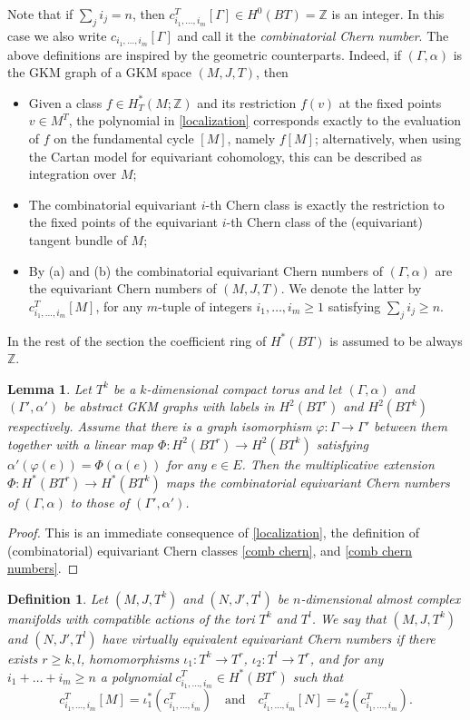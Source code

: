 \documentclass[12pt,a4paper]{amsart}
\newcommand{\ZZ}{\mathbb{Z}}
\newtheorem{lem}[thm]{Lemma}
\theoremstyle{plain}
\newtheorem{defn}[thm]{Definition}
\theoremstyle{definition}
\begin{document}
Note that if $\sum_j i_j =n $, then $c^T_{i_1,\ldots,i_m}[\Gamma]\in H^0(BT)=\mathbb{Z}$ is an integer. In this case we also write $c_{i_1,\ldots,i_m}[\Gamma]$ and call it the \emph{combinatorial Chern number}.
The above definitions are inspired by the geometric counterparts. Indeed,
if $(\Gamma,\alpha)$ is the GKM graph of a GKM space $(M,J,T)$, then
\begin{itemize}
\item[(a)] Given a class $f\in H^*_T(M;\ZZ)$ and its restriction $f(v)$ at the fixed points $v\in M^T$,  
the polynomial in \eqref{localization} corresponds exactly to the evaluation of $f$ on the
fundamental cycle $[M]$, namely $f[M]$; alternatively, when using the
	Cartan model for 
equivariant cohomology, this can be described as integration over $M$; 
\item[(b)] The combinatorial equivariant $i$-th Chern class is exactly the restriction to the fixed points
of the equivariant $i$-th Chern class of the (equivariant) tangent bundle of $M$;
\item[(c)] By (a) and (b) the combinatorial equivariant Chern numbers of $(\Gamma,\alpha)$ are the equivariant Chern numbers of $(M,J,T)$.
We denote the latter by $ c^T_{i_1,\ldots,i_m}[M]$, for any $m$-tuple of integers $i_1,\ldots,i_m\geq 1$ satisfying $\sum_j i_j\geq n$.
\end{itemize}
 In the rest of the section the coefficient ring of $H^*(BT)$ is assumed to be always $\ZZ$.
\begin{lem}\label{lem: restrict chern numbers}
Let $T^k$ be a $k$-dimensional compact torus and
let $(\Gamma,\alpha)$ and $(\Gamma',\alpha')$ be abstract GKM graphs with labels in $H^2(BT^r)$ and $H^2(BT^k)$ respectively. Assume that there is a graph isomorphism $\varphi\colon \Gamma\rightarrow \Gamma'$ between them together with a linear map $\Phi\colon H^2(BT^r)\rightarrow H^2(BT^k)$ satisfying $\alpha'(\varphi(e))=\Phi(\alpha(e))$ for any $e\in E$. Then the multiplicative extension $\Phi\colon H^*(BT^r)\rightarrow H^*(BT^k)$ maps the combinatorial equivariant Chern numbers of $(\Gamma,\alpha)$ to those of $(\Gamma',\alpha')$.
\end{lem}

\begin{proof}
This is an immediate consequence of \eqref{localization}, the definition of (combinatorial) equivariant Chern classes \eqref{comb chern}, and \eqref{comb chern numbers}.
\end{proof}

\begin{defn}\label{defn: virtually equiv chern number}
Let $(M,J,T^k)$ and $(N,J',T^l)$ be $n$-dimensional almost complex manifolds with compatible actions of the tori $T^k$ and $T^l$. We say that $(M,J,T^k)$ and $(N,J',T^l)$ have 
\emph{virtually equivalent equivariant Chern numbers} if there exists $r\geq k,l$, homomorphisms $\iota_1\colon T^k\rightarrow T^r$, $\iota_2\colon T^l \to T^r$, and for any $i_1+\ldots+i_m\geq n$ a polynomial 
$c^T_{i_1,\ldots,i_m}\in H^*(BT^r)$  such that
\[c^T_{i_1,\ldots,i_m}[M] = \iota_1^*(c^T_{i_1,\ldots,i_m})\quad \text{and}\quad
c^T_{i_1,\ldots,i_m}[N]=\iota_2^*(c^T_{i_1,\ldots,i_m}).\]

\end{defn}
\end{document}
